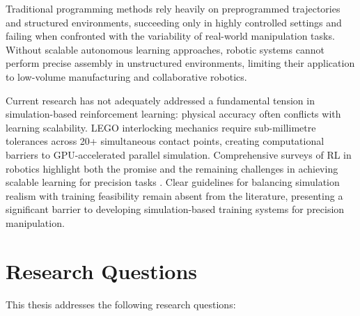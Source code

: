 \documentclass[12pt,a4paper,oneside]{report}
\begin{document}
Traditional programming methods rely heavily on preprogrammed trajectories and structured environments, succeeding only in highly controlled settings and failing when confronted with the variability of real-world manipulation tasks. Without scalable autonomous learning approaches, robotic systems cannot perform precise assembly in unstructured environments, limiting their application to low-volume manufacturing and collaborative robotics.

Current research has not adequately addressed a fundamental tension in simulation-based reinforcement learning: physical accuracy often conflicts with learning scalability. LEGO interlocking mechanics require sub-millimetre tolerances across 20+ simultaneous contact points, creating computational barriers to GPU-accelerated parallel simulation. Comprehensive surveys of RL in robotics highlight both the promise and the remaining challenges in achieving scalable learning for precision tasks \cite{koberReinforcementLearningRoboticsc}. Clear guidelines for balancing simulation realism with training feasibility remain absent from the literature, presenting a significant barrier to developing simulation-based training systems for precision manipulation\cite{WelcomePhysXPhysX, argallSurveyRobotLearning2009}.

\section{Research Questions}

This thesis addresses the following research questions:
\end{document}
